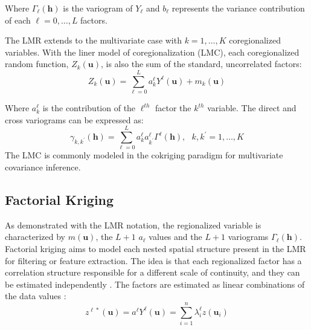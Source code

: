 Where $\Gamma_{\ell}(\mathbf{h})$ is the variogram of $Y_{\ell}$ and $b_{\ell}$ represents the variance contribution of each $\ell=0,\dots,L$ factors.

The LMR extends to the multivariate case with $k=1,\dots,K$ coregionalized variables. With the liner model of coregionalization (LMC), each coregionalized random function, $Z_{k}(\mathbf{u})$, is also the sum of the standard, uncorrelated factors:
\begin{equation*}
    Z_{k}(\mathbf{u}) = \sum_{\ell=0}^{L} a^{\ell}_{k} Y^{\ell}(\mathbf{u}) + m_{k}(\mathbf{u})
\end{equation*}

Where $a^{\ell}_{k}$ is the contribution of the $\ell^{th}$ factor the $k^{th}$ variable. The direct and cross variograms can be expressed as:
\begin{equation*}
    \gamma_{k,k^{\prime}}(\mathbf{h}) = \sum_{\ell=0}^{L} a^{\ell}_{k} a^{\ell}_{k^{\prime}} \Gamma^{\ell}(\mathbf{h}), \ \ \ k,k^{\prime} = 1,\dots,K
\end{equation*}
The LMC is commonly modeled in the cokriging paradigm for multivariate covariance inference.

\FloatBarrier
\subsection{Factorial Kriging}
\label{subsec:01factorial}

As demonstrated with the LMR notation, the regionalized variable is characterized by $m(\mathbf{u})$, the $L + 1$ $a_{\ell}$ values and the $L + 1$ variograms $\Gamma_{\ell}(\mathbf{h})$. Factorial kriging aims to model each nested spatial structure present in the LMR for filtering or feature extraction. The idea is that each regionalized factor has a correlation structure responsible for a different scale of continuity, and they can be estimated independently \citep{matheron1982factorial}. The factors are estimated as linear combinations of the data values \cite{deutsch2007recall}:
\begin{equation*}
    z^{\ell*}(\mathbf{u}) = a^{\ell} Y^{\ell}(\mathbf{u}) = \sum_{i=1}^{n} \lambda_{i}^{\ell} z(\mathbf{u}_{i})
\end{equation*}


